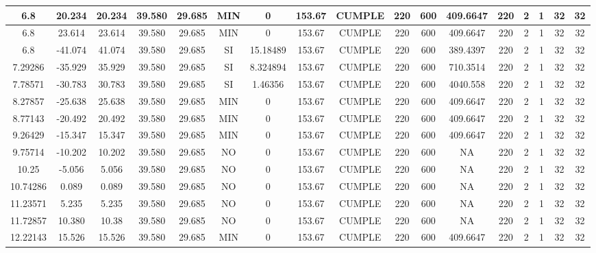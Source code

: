 \begin{table}[h]
{\begin{tabular}{|c|c|c|c|c|c|c|c|c|c|c|c|c|c|c|c|c|}
    \hline
    6.8 & 20.234 & 20.234 & 39.580 & 29.685 & MIN & 0   & 153.67 & CUMPLE & 220 & 600 & 409.6647 & 220 & 2   & 1   & 32  & 32 \bigstrut\\
    \hline
    6.8 & 23.614 & 23.614 & 39.580 & 29.685 & MIN & 0   & 153.67 & CUMPLE & 220 & 600 & 409.6647 & 220 & 2   & 1   & 32  & 32 \bigstrut\\
    \hline
    6.8 & -41.074 & 41.074 & 39.580 & 29.685 & SI  & 15.18489 & 153.67 & CUMPLE & 220 & 600 & 389.4397 & 220 & 2   & 1   & 32  & 32 \bigstrut\\
    \hline
    7.29286 & -35.929 & 35.929 & 39.580 & 29.685 & SI  & 8.324894 & 153.67 & CUMPLE & 220 & 600 & 710.3514 & 220 & 2   & 1   & 32  & 32 \bigstrut\\
    \hline
    7.78571 & -30.783 & 30.783 & 39.580 & 29.685 & SI  & 1.46356 & 153.67 & CUMPLE & 220 & 600 & 4040.558 & 220 & 2   & 1   & 32  & 32 \bigstrut\\
    \hline
    8.27857 & -25.638 & 25.638 & 39.580 & 29.685 & MIN & 0   & 153.67 & CUMPLE & 220 & 600 & 409.6647 & 220 & 2   & 1   & 32  & 32 \bigstrut\\
    \hline
    8.77143 & -20.492 & 20.492 & 39.580 & 29.685 & MIN & 0   & 153.67 & CUMPLE & 220 & 600 & 409.6647 & 220 & 2   & 1   & 32  & 32 \bigstrut\\
    \hline
    9.26429 & -15.347 & 15.347 & 39.580 & 29.685 & MIN & 0   & 153.67 & CUMPLE & 220 & 600 & 409.6647 & 220 & 2   & 1   & 32  & 32 \bigstrut\\
    \hline
    9.75714 & -10.202 & 10.202 & 39.580 & 29.685 & NO  & 0   & 153.67 & CUMPLE & 220 & 600 & NA  & 220 & 2   & 1   & 32  & 32 \bigstrut\\
    \hline
    10.25 & -5.056 & 5.056 & 39.580 & 29.685 & NO  & 0   & 153.67 & CUMPLE & 220 & 600 & NA  & 220 & 2   & 1   & 32  & 32 \bigstrut\\
    \hline
    10.74286 & 0.089 & 0.089 & 39.580 & 29.685 & NO  & 0   & 153.67 & CUMPLE & 220 & 600 & NA  & 220 & 2   & 1   & 32  & 32 \bigstrut\\
    \hline
    11.23571 & 5.235 & 5.235 & 39.580 & 29.685 & NO  & 0   & 153.67 & CUMPLE & 220 & 600 & NA  & 220 & 2   & 1   & 32  & 32 \bigstrut\\
    \hline
    11.72857 & 10.380 & 10.38 & 39.580 & 29.685 & NO  & 0   & 153.67 & CUMPLE & 220 & 600 & NA  & 220 & 2   & 1   & 32  & 32 \bigstrut\\
    \hline
    12.22143 & 15.526 & 15.526 & 39.580 & 29.685 & MIN & 0   & 153.67 & CUMPLE & 220 & 600 & 409.6647 & 220 & 2   & 1   & 32  & 32 \bigstrut\\

\end{tabular}}
\end{table}
